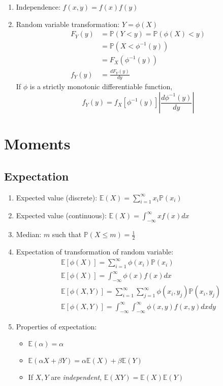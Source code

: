 \documentclass[%
 aip,
 jmp,%
 amsmath,amssymb,
 reprint,%
]{revtex4-1}
\def\P{\mathbb{P}}
\def\E{\mathbb{E}}
\begin{document}
\begin{enumerate}
   \item Independence: $f(x,y)=f(x)f(y)$

   \item Random variable transformation: $Y = \phi(X)$
       \begin{align*}
         F_Y(y) &= \P(Y < y) = \P(\phi(X) < y) \\
                &= \P(X < \phi^{-1}(y)) \\
                &= F_X(\phi^{-1}(y)) \\
         f_Y(y) &= \frac{dF_Y(y)}{dy}
       \end{align*}
       If $\phi$ is a strictly monotonic differentiable function,
       $$ f_Y(y) = f_X[\phi^{-1}(y)]\left\rvert\frac{d\phi^{-1}(y)}{dy}\right\rvert $$

\end{enumerate}


\section{Moments}
\subsection{Expectation}
\begin{enumerate}
    \item Expected value (discrete): $\E(X) = \sum_{i=1}^{\infty}x_i\P(x_i)$
    \item Expected value (continuous): $\E(X) = \int_{-\infty}^{\infty} xf(x) dx$
    \item Median: $m$ such that $\P(X \le m) = \frac{1}{2}$
    \item Expectation of transformation of random variable:
        \begin{align*}
            & \E[\phi(X)] = \sum_{i=1}^{\infty} \phi(x_i) \P(x_i) \\
            & \E[\phi(X)] = \int_{-\infty}^{\infty} \phi(x)f(x) dx \\
            & \E[\phi(X,Y)] = \sum_{i=1}^{\infty}\sum_{j=1}^{\infty} \phi(x_i,y_j) \P(x_i,y_j) \\
            & \E[\phi(X,Y)] = \int_{-\infty}^{\infty}\int_{-\infty}^{\infty} \phi(x,y)f(x,y) dxdy
        \end{align*}
    \item Properties of expectation:
        \begin{itemize}
            \item $\E(\alpha)=\alpha$
            \item $\E(\alpha X + \beta Y) = \alpha\E(X) + \beta\E(Y)$
            \item If $X,Y$ are \emph{independent}, $\E(XY) = \E(X)\E(Y)$
        \end{itemize}
\end{enumerate}
\end{document}
